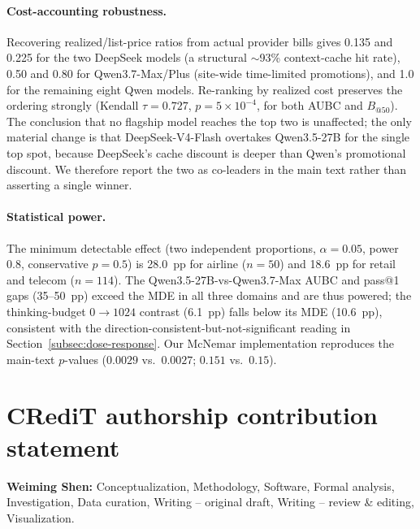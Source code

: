 \documentclass[preprint,authoryear,12pt]{elsarticle}
\begin{document}
\paragraph{Cost-accounting robustness.} Recovering realized/list-price ratios from actual provider bills gives 0.135 and 0.225 for the two DeepSeek models (a structural $\sim$93\% context-cache hit rate), 0.50 and 0.80 for Qwen3.7-Max/Plus (site-wide time-limited promotions), and 1.0 for the remaining eight Qwen models. Re-ranking by realized cost preserves the ordering strongly (Kendall $\tau=0.727$, $p=5\times10^{-4}$, for both AUBC and $B_{@50}$). The conclusion that no flagship model reaches the top two is unaffected; the only material change is that DeepSeek-V4-Flash overtakes Qwen3.5-27B for the single top spot, because DeepSeek's cache discount is deeper than Qwen's promotional discount. We therefore report the two as co-leaders in the main text rather than asserting a single winner.

\paragraph{Statistical power.} The minimum detectable effect (two independent proportions, $\alpha=0.05$, power 0.8, conservative $p=0.5$) is 28.0~pp for airline ($n=50$) and 18.6~pp for retail and telecom ($n=114$). The Qwen3.5-27B-vs-Qwen3.7-Max AUBC and pass@1 gaps (35--50~pp) exceed the MDE in all three domains and are thus powered; the thinking-budget $0\!\to\!1024$ contrast (6.1~pp) falls below its MDE (10.6~pp), consistent with the direction-consistent-but-not-significant reading in Section~\ref{subsec:dose-response}. Our McNemar implementation reproduces the main-text $p$-values ($0.0029$ vs.\ $0.0027$; $0.151$ vs.\ $0.15$).


\section*{CRediT authorship contribution statement}
\noindent\textbf{Weiming Shen:} Conceptualization, Methodology, Software, Formal analysis, Investigation, Data curation, Writing -- original draft, Writing -- review \& editing, Visualization.



\end{document}

